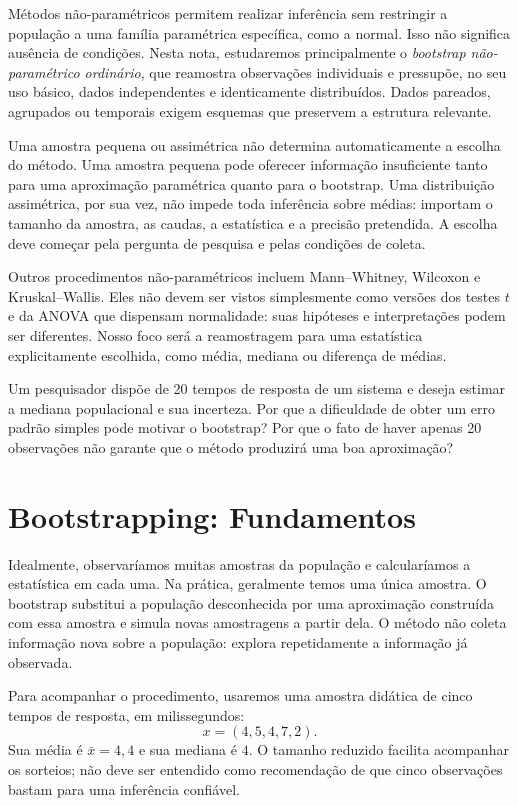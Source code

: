 \documentclass[12pt,a4paper]{article}
\begin{document}
Métodos não-paramétricos permitem realizar inferência sem restringir a população a uma família paramétrica específica, como a normal. Isso não significa ausência de condições. Nesta nota, estudaremos principalmente o \emph{bootstrap não-paramétrico ordinário}, que reamostra observações individuais e pressupõe, no seu uso básico, dados independentes e identicamente distribuídos. Dados pareados, agrupados ou temporais exigem esquemas que preservem a estrutura relevante.

Uma amostra pequena ou assimétrica não determina automaticamente a escolha do método. Uma amostra pequena pode oferecer informação insuficiente tanto para uma aproximação paramétrica quanto para o bootstrap. Uma distribuição assimétrica, por sua vez, não impede toda inferência sobre médias: importam o tamanho da amostra, as caudas, a estatística e a precisão pretendida. A escolha deve começar pela pergunta de pesquisa e pelas condições de coleta.

Outros procedimentos não-paramétricos incluem Mann--Whitney, Wilcoxon e Kruskal--Wallis. Eles não devem ser vistos simplesmente como versões dos testes $t$ e da ANOVA que dispensam normalidade: suas hipóteses e interpretações podem ser diferentes. Nosso foco será a reamostragem para uma estatística explicitamente escolhida, como média, mediana ou diferença de médias.

\begin{perguntabox}
Um pesquisador dispõe de 20 tempos de resposta de um sistema e deseja estimar a mediana populacional e sua incerteza. Por que a dificuldade de obter um erro padrão simples pode motivar o bootstrap? Por que o fato de haver apenas 20 observações não garante que o método produzirá uma boa aproximação?
\end{perguntabox}

\section{Bootstrapping: Fundamentos}
\label{sec:fundamentos}
Idealmente, observaríamos muitas amostras da população e calcularíamos a estatística em cada uma. Na prática, geralmente temos uma única amostra. O bootstrap substitui a população desconhecida por uma aproximação construída com essa amostra e simula novas amostragens a partir dela. O método não coleta informação nova sobre a população: explora repetidamente a informação já observada.

Para acompanhar o procedimento, usaremos uma amostra didática de cinco tempos de resposta, em milissegundos:
\[
x=(4,5,4,7,2).
\]
Sua média é $\bar x=4{,}4$ e sua mediana é $4$. O tamanho reduzido facilita acompanhar os sorteios; não deve ser entendido como recomendação de que cinco observações bastam para uma inferência confiável.
\end{document}
